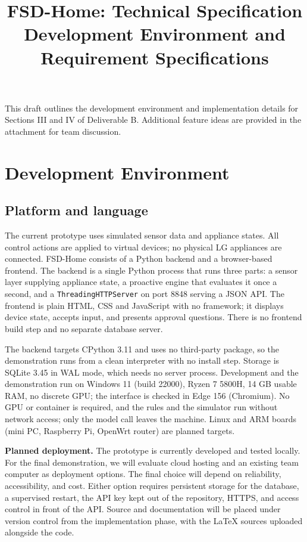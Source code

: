 \documentclass[conference]{IEEEtran}
\begin{document}
\title{FSD-Home: Technical Specification\\ \large Development Environment and Requirement Specifications}
\author{}
\maketitle
\setcounter{section}{2}

This draft outlines the development environment and implementation details for Sections III and IV of Deliverable B. Additional feature ideas are provided in the attachment for team discussion.

\section{Development Environment}

\subsection{Platform and language}

The current prototype uses simulated sensor data and appliance states. All control actions are applied to virtual devices; no physical LG appliances are connected. FSD-Home consists of a Python backend and a browser-based frontend. The backend is a single Python process that runs three parts: a sensor layer supplying appliance state, a proactive engine that evaluates it once a second, and a \texttt{ThreadingHTTPServer} on port 8848 serving a JSON API. The frontend is plain HTML, CSS and JavaScript with no framework; it displays device state, accepts input, and presents approval questions. There is no frontend build step and no separate database server.

The backend targets CPython 3.11 and uses no third-party package, so the demonstration runs from a clean interpreter with no install step. Storage is SQLite 3.45 in WAL mode, which needs no server process. Development and the demonstration run on Windows 11 (build 22000), Ryzen 7 5800H, 14 GB usable RAM, no discrete GPU; the interface is checked in Edge 156 (Chromium). No GPU or container is required, and the rules and the simulator run without network access; only the model call leaves the machine. Linux and ARM boards (mini PC, Raspberry Pi, OpenWrt router) are planned targets.

\textbf{Planned deployment.} The prototype is currently developed and tested locally. For the final demonstration, we will evaluate cloud hosting and an existing team computer as deployment options. The final choice will depend on reliability, accessibility, and cost. Either option requires persistent storage for the database, a supervised restart, the API key kept out of the repository, HTTPS, and access control in front of the API. Source and documentation will be placed under version control from the implementation phase, with the LaTeX sources uploaded alongside the code.
\end{document}
